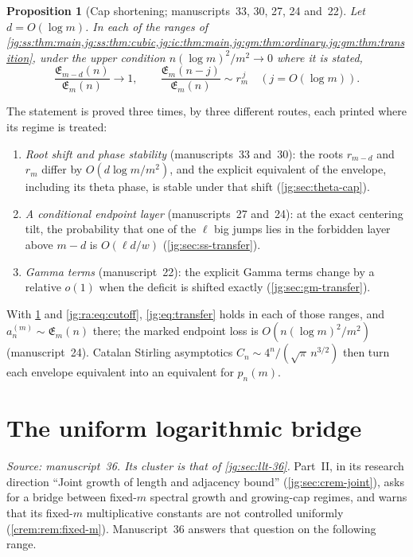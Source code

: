 \documentclass[11pt,a4paper]{article}
\newtheorem{proposition}[proposition]{Proposition}
\theoremstyle{definition}\newaliascnt{definition}{theorem}
\theoremstyle{remark}\newaliascnt{remark}{theorem}
\begin{document}
\begin{proposition}[Cap shortening; manuscripts~33, 30, 27, 24 and~22]
\label{jg:prop:capshort}
Let $d=O(\log m)$. In each of the ranges of
\cref{jg:ss:thm:main,jg:ss:thm:cubic,jg:ic:thm:main,jg:gm:thm:ordinary,jg:gm:thm:transition},
under the upper condition $n(\log m)^2/m^2\to0$ where it is stated,
\[
 \frac{\mathfrak E_{m-d}(n)}{\mathfrak E_m(n)}\longrightarrow1,
 \qquad
 \frac{\mathfrak E_m(n-j)}{\mathfrak E_m(n)}\sim r_m^{\,j}\quad(j=O(\log m)).
\]
\end{proposition}
The statement is proved three times, by three different routes, each printed
where its regime is treated:
\begin{enumerate}
\item \emph{Root shift and phase stability} (manuscripts~33 and~30): the roots
 $r_{m-d}$ and $r_m$ differ by $O(d\log m/m^2)$, and the explicit equivalent
 of the envelope, including its theta phase, is stable under that shift
 (\cref{jg:sec:theta-cap}).
\item \emph{A conditional endpoint layer} (manuscripts~27 and~24): at the
 exact centering tilt, the probability that one of the $\ell$ big jumps lies in
 the forbidden layer above $m-d$ is $O(\ell d/w)$ (\cref{jg:sec:ss-transfer}).
\item \emph{Gamma terms} (manuscript~22): the explicit Gamma terms change by a
 relative $o(1)$ when the deficit is shifted exactly
 (\cref{jg:sec:gm-transfer}).
\end{enumerate}
With \cref{jg:prop:capshort} and \eqref{jg:ra:eq:cutoff}, \eqref{jg:eq:transfer}
holds in each of those ranges, and $a_n^{(m)}\sim\mathfrak E_m(n)$ there; the
marked endpoint loss is $O(n(\log m)^2/m^2)$ (manuscript~24). Catalan Stirling
asymptotics $C_n\sim4^n/(\sqrt\pi\,n^{3/2})$ then turn each envelope equivalent
into an equivalent for $p_n(m)$.

\section{The uniform logarithmic bridge}
\label{jg:sec:bridge}
\emph{Source: manuscript~36. Its cluster is that of \cref{jg:sec:llt-36}.}
Part~II, in its research direction ``Joint growth of length and adjacency
bound'' (\cref{jg:sec:crem-joint}), asks for a bridge between fixed-$m$
spectral growth and growing-cap regimes, and warns that its fixed-$m$
multiplicative constants are not controlled uniformly
(\cref{crem:rem:fixed-m}). Manuscript~36 answers that question on the
following range.
\end{document}
